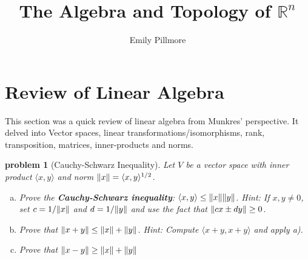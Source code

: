 \documentclass[10pt, oneside]{article}   	%
\title{The Algebra and Topology of $\mathbb{R}^n$}
\author{Emily Pillmore}
\newcommand{\innerprod}[2]{\langle #1, #2 \rangle}
\DeclarePairedDelimiter{\norm}{\lVert}{\rVert}
\newtheorem{problem}[theorem]{problem}
\begin{document}
\maketitle
\section{Review of Linear Algebra}

This section was a quick review of linear algebra from Munkres' perspective. It delved into Vector spaces, linear transformations/isomorphisms, rank, transposition, matrices, inner-products and norms.

\begin{problem}[Cauchy-Schwarz Inequality]

Let $V$ be a vector space with inner product $\innerprod{x}{y}$ and norm $\norm{x} = \innerprod{x}{y}^{1/2}$.

\begin{center}
\begin{enumerate}[a)]
	\item Prove the \textbf{Cauchy-Schwarz inequality}: $\innerprod{x}{y} \leq \norm{x}\norm{y}$. \textit{Hint:} If $x,y \neq 0$, set $c = 1/\norm{x}$ and $d = 1/\norm{y}$  and use the fact that $\norm{cx \pm dy} \geq 0$.
	\item Prove that $\norm{x + y} \leq \norm{x} + \norm{y}$. \textit{Hint:} Compute $\innerprod{x + y}{x + y}$ and apply a).
	\item Prove that $\norm{x - y} \geq \norm{x} + \norm{y}$
\end{enumerate}
\end{center}
\end{problem}
\end{document}
